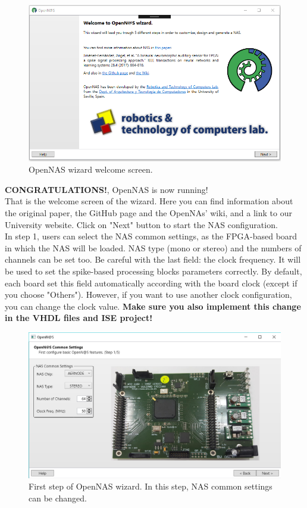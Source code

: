 \begin{figure}[H]
\centering
\includegraphics[width=1\textwidth]{images/Img13_VS_Init_App.PNG}
\caption{\label{fig:OpenNAS_Wizard_Welcome}OpenNAS wizard welcome screen.}
\end{figure}

\textbf{CONGRATULATIONS!}, OpenNAS is now running!\\ 

That is the welcome screen of the wizard. Here you can find information about the original paper, the GitHub page and the OpenNAs' wiki, and a link to our University website. Click on "Next" button to start the NAS configuration.\\

In step 1, users can select the NAS common settings, as the FPGA-based board in which the NAS will be loaded. NAS type (mono or stereo) and the numbers of channels can be set too. Be careful with the last field: the clock frequency. It will be used to set the spike-based processing blocks parameters correctly. By default, each board set this field automatically according with the board clock (except if you choose "Others"). However, if you want to use another clock configuration, you can change the clock value. \textbf{Make sure you also implement this change in the VHDL files and ISE project!}

\begin{figure}[H]
\centering
\includegraphics[width=1\textwidth]{images/Img14_VS_Step1.PNG}
\caption{\label{fig:OpenNAS_common_settings}First step of OpenNAS wizard. In this step, NAS common settings can be changed.}
\end{figure}

